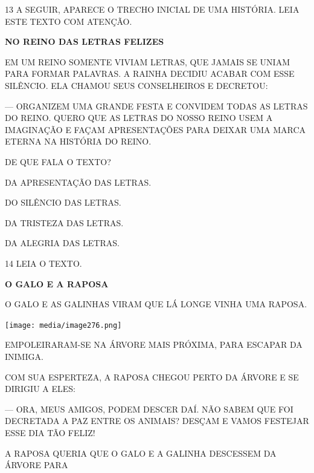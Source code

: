 \num{13} A SEGUIR, APARECE O TRECHO INICIAL DE UMA HISTÓRIA. LEIA ESTE TEXTO COM ATENÇÃO.

\begin{myquote}
\textbf{NO REINO DAS LETRAS FELIZES}

EM UM REINO SOMENTE 
VIVIAM LETRAS, QUE JAMAIS SE UNIAM 
PARA FORMAR PALAVRAS. A RAINHA DECIDIU ACABAR COM ESSE 
SILÊNCIO. ELA CHAMOU SEUS CONSELHEIROS E DECRETOU:

--- ORGANIZEM UMA GRANDE FESTA E CONVIDEM TODAS AS 
LETRAS DO REINO. QUERO QUE AS LETRAS DO NOSSO REINO USEM 
A IMAGINAÇÃO E FAÇAM APRESENTAÇÕES PARA DEIXAR UMA MARCA 
ETERNA NA HISTÓRIA DO REINO.

\end{myquote}

DE QUE FALA O TEXTO?

\begin{escolha}
\item DA APRESENTAÇÃO DAS LETRAS.

\item DO SILÊNCIO DAS LETRAS.

\item DA TRISTEZA DAS LETRAS. 

\item DA ALEGRIA DAS LETRAS.
\end{escolha}

\pagebreak

\num{14} LEIA O TEXTO.

\begin{myquote}
\textbf{O GALO E A RAPOSA}

O GALO E AS GALINHAS VIRAM QUE LÁ LONGE VINHA UMA RAPOSA.

\begin{center}
\texttt{[image: media/image276.png]}
\end{center}

EMPOLEIRARAM-SE NA ÁRVORE MAIS PRÓXIMA, PARA ESCAPAR DA INIMIGA.

COM SUA ESPERTEZA, A RAPOSA CHEGOU PERTO DA ÁRVORE E
SE DIRIGIU A ELES:

--- ORA, MEUS AMIGOS, PODEM DESCER DAÍ. NÃO SABEM QUE
FOI DECRETADA A PAZ ENTRE OS ANIMAIS? DESÇAM E VAMOS FESTEJAR ESSE
DIA TÃO FELIZ!

\end{myquote}

A RAPOSA QUERIA QUE O GALO E A GALINHA DESCESSEM DA ÁRVORE PARA

